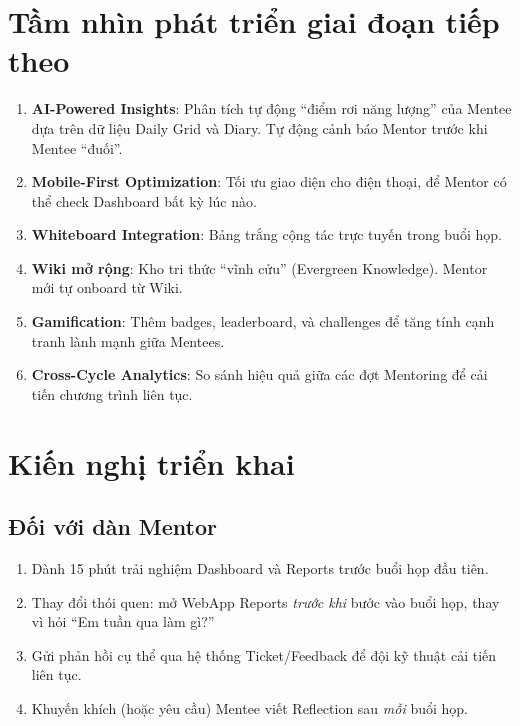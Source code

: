 \section{Tầm nhìn phát triển giai đoạn tiếp theo}

\begin{enumerate}
  \item \textbf{AI-Powered Insights}: Phân tích tự động ``điểm rơi năng lượng'' của Mentee dựa trên dữ liệu Daily Grid và Diary. Tự động cảnh báo Mentor trước khi Mentee ``đuối''.
  \item \textbf{Mobile-First Optimization}: Tối ưu giao diện cho điện thoại, để Mentor có thể check Dashboard bất kỳ lúc nào.
  \item \textbf{Whiteboard Integration}: Bảng trắng cộng tác trực tuyến trong buổi họp.
  \item \textbf{Wiki mở rộng}: Kho tri thức ``vĩnh cửu'' (Evergreen Knowledge). Mentor mới tự onboard từ Wiki.
  \item \textbf{Gamification}: Thêm badges, leaderboard, và challenges để tăng tính cạnh tranh lành mạnh giữa Mentees.
  \item \textbf{Cross-Cycle Analytics}: So sánh hiệu quả giữa các đợt Mentoring để cải tiến chương trình liên tục.
\end{enumerate}

\section{Kiến nghị triển khai}

\subsection{Đối với dàn Mentor}
\begin{enumerate}
  \item Dành 15 phút trải nghiệm Dashboard và Reports trước buổi họp đầu tiên.
  \item Thay đổi thói quen: mở WebApp Reports \textit{trước khi} bước vào buổi họp, thay vì hỏi ``Em tuần qua làm gì?''
  \item Gửi phản hồi cụ thể qua hệ thống Ticket/Feedback để đội kỹ thuật cải tiến liên tục.
  \item Khuyến khích (hoặc yêu cầu) Mentee viết Reflection sau \textit{mỗi} buổi họp.
\end{enumerate}

